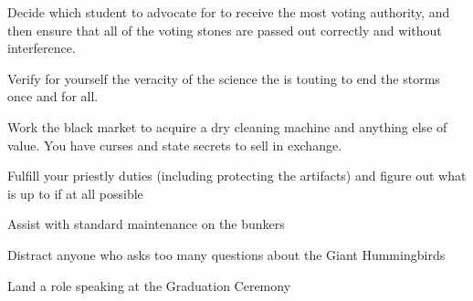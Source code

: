 \documentclass[char]{GL2020}
\begin{document}
%
%
%
%
%
%
%
%

\begin{itemz}[Goals]
	\item Decide which \pFarm{} student to advocate for to receive the most voting authority, and then ensure that all of the voting stones are passed out correctly and without interference.
	\item Verify for yourself the veracity of the science the \pTech{} is touting to end the storms once and for all.
	\item Work the black market to acquire a dry cleaning machine and anything else of value. You have curses and state secrets to sell in exchange.
	\item Fulfill your priestly duties (including protecting the artifacts) and figure out what \cInterpol{} is up to if at all possible
	\item Assist \cBunker{} with standard maintenance on the bunkers
	\item Distract anyone who asks too many questions about the Giant Hummingbirds
	\item Land a role speaking at the Graduation Ceremony
\end{itemz}

\begin{itemz}[Notes]
	\item 
\end{itemz}
\end{document}
